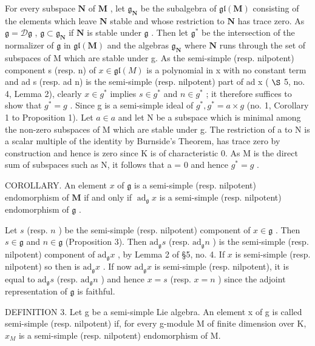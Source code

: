 For every subspace \(\mathbf{N}\) of \(\mathbf{M}\) , let \(\mathfrak{g}_{\mathbf{N}}\) be the subalgebra of \(\mathfrak{gl}(\mathbf{M})\) consisting of the elements which leave \(\mathbf{N}\) stable and whose restriction to \(\mathbf{N}\) has trace zero. As \(\mathfrak{g} = \mathcal{D}\mathfrak{g}\) , \(\mathfrak{g} \subset \mathfrak{g}_{\mathbf{N}}\) if \(\mathbf{N}\) is stable under \(\mathfrak{g}\) . Then let \(\mathfrak{g}^*\) be the intersection of the normalizer of \(\mathfrak{g}\) in \(\mathfrak{gl}(\mathbf{M})\) and the algebras \(\mathfrak{g}_{\mathbf{N}}\) where \(\mathbf{N}\) runs through the set of subspaces of M which are stable under g. As the semi-simple (resp. nilpotent) component s (resp. n) of \(x \in \mathfrak{gl}(M)\) is a polynomial in x with no constant term and ad s (resp. ad n) is the semi-simple (resp. nilpotent) part of ad x ( \(\S\) 5, no. 4, Lemma 2), clearly \(x \in g^{*}\) implies \(s \in g^{*}\) and \(n \in g^{*}\) ; it therefore suffices to show that \(g^{*} = g\) . Since g is a semi-simple ideal of \(g^{*}, g^{*} = a \times g\) (no. 1, Corollary 1 to Proposition 1). Let \(a \in a\) and let N be a subspace which is minimal among the non-zero subspaces of M which are stable under g. The restriction of a to N is a scalar multiple of the identity by Burnside's Theorem, has trace zero by construction and hence is zero since K is of characteristic 0. As M is the direct sum of subspaces such as N, it follows that a = 0 and hence \(g^{*} = g\) .

COROLLARY. An element \(x\) of \(\mathfrak{g}\) is a semi-simple (resp. nilpotent) endomorphism of \(\mathbf{M}\) if and only if \(\operatorname{ad}_{\mathfrak{g}} x\) is a semi-simple (resp. nilpotent) endomorphism of \(\mathfrak{g}\) .

Let \(s\) (resp. \(n\) ) be the semi-simple (resp. nilpotent) component of \(x \in \mathfrak{g}\) . Then \(s \in \mathfrak{g}\) and \(n \in \mathfrak{g}\) (Proposition 3). Then \(\mathrm{ad}_{\mathfrak{g}} s\) (resp. \(\mathrm{ad}_{\mathfrak{g}} n\) ) is the semi-simple (resp. nilpotent) component of \(\mathrm{ad}_{\mathfrak{g}} x\) , by Lemma 2 of §5, no. 4. If \(x\) is semi-simple (resp. nilpotent) so then is \(\mathrm{ad}_{\mathfrak{g}} x\) . If now \(\mathrm{ad}_{\mathfrak{g}} x\) is semi-simple (resp. nilpotent), it is equal to \(\mathrm{ad}_{\mathfrak{g}} s\) (resp. \(\mathrm{ad}_{\mathfrak{g}} n\) ) and hence \(x = s\) (resp. \(x = n\) ) since the adjoint representation of \(\mathfrak{g}\) is faithful.

DEFINITION 3. Let g be a semi-simple Lie algebra. An element x of g is called semi-simple (resp. nilpotent) if, for every g-module M of finite dimension over K, \(x_{M}\) is a semi-simple (resp. nilpotent) endomorphism of M.

